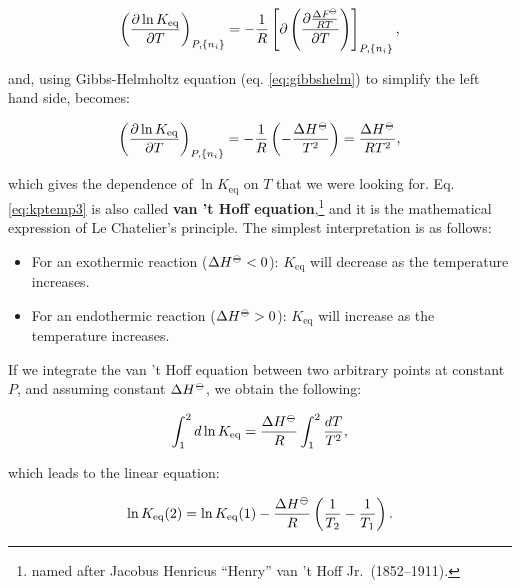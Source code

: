 \documentclass[
]{book}
\providecommand{\tightlist}{%
  \setlength{\itemsep}{0pt}\setlength{\parskip}{0pt}}
\theoremstyle{definition}
\theoremstyle{definition}
\theoremstyle{definition}
\theoremstyle{remark}
\begin{document}
\begin{equation}
\left( \frac{\partial \ln K_{\text{eq}}}{\partial T} \right)_{P,\{n_i\}} = -\frac{1}{R} \left[ \partial \left( \frac{\partial \frac{\Delta F^{-\kern-6pt{\ominus}\kern-6pt-}}{RT}}{\partial T} \right) \right]_{P,\{n_i\}},
\label{eq:kptemp2}
\end{equation}

and, using Gibbs-Helmholtz equation (eq. \eqref{eq:gibbshelm}) to simplify the left hand side, becomes:

\begin{equation}
\left( \frac{\partial \ln K_{\text{eq}}}{\partial T} \right)_{P,\{n_i\}} = -\frac{1}{R} \left( -\frac{\Delta H^{-\kern-6pt{\ominus}\kern-6pt-}}{T^2} \right) = \frac{\Delta H^{-\kern-6pt{\ominus}\kern-6pt-}}{RT^2},
\label{eq:kptemp3}
\end{equation}

which gives the dependence of \(\ln K_{\text{eq}}\) on \(T\) that we were looking for. Eq. \eqref{eq:kptemp3} is also called \textbf{van 't Hoff equation},\footnote{named after Jacobus Henricus ``Henry'' van 't Hoff Jr.~(1852--1911).} and it is the mathematical expression of Le Chatelier's principle. The simplest interpretation is as follows:

\begin{itemize}
\tightlist
\item
  For an exothermic reaction (\(\Delta H^{-\kern-6pt{\ominus}\kern-6pt-}< 0\)): \(K_{\text{eq}}\) will decrease as the temperature increases.
\item
  For an endothermic reaction (\(\Delta H^{-\kern-6pt{\ominus}\kern-6pt-}> 0\)): \(K_{\text{eq}}\) will increase as the temperature increases.
\end{itemize}

If we integrate the van 't Hoff equation between two arbitrary points at constant \(P\), and assuming constant \(\Delta H^{-\kern-6pt{\ominus}\kern-6pt-}\), we obtain the following:

\begin{equation}
\int_1^2 d \ln K_{\text{eq}} = \frac{\Delta H^{-\kern-6pt{\ominus}\kern-6pt-}}{R} \int_1^2 \frac{dT}{T^2},
\label{eq:kptemp4}
\end{equation}

which leads to the linear equation:

\begin{equation}
\ln K_{\text{eq}}(2) = \ln K_{\text{eq}}(1) - \frac{\Delta H^{-\kern-6pt{\ominus}\kern-6pt-}}{R} \left( \frac{1}{T_2}-\frac{1}{T_1} \right).
\label{eq:vthoffeqI}
\end{equation}
\end{document}
